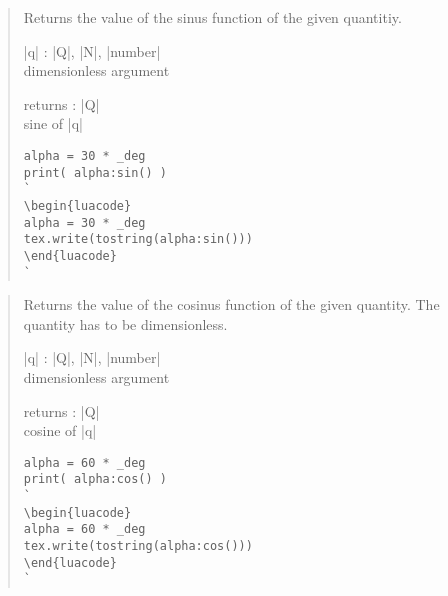 \documentclass{ltxdoc}
\begin{document}
\begin{quote}
  Returns the value of the sinus function of the given quantitiy.

  \begin{description}
  \item |q| : |Q|, |N|, |number|\\
    dimensionless argument

  \item returns : |Q|\\
    sine of |q|
  \end{description}

\begin{lstlisting}
alpha = 30 * _deg
print( alpha:sin() )
`
\begin{luacode}
alpha = 30 * _deg
tex.write(tostring(alpha:sin()))
\end{luacode}
`
\end{lstlisting}

\end{quote}



\begin{quote}
  Returns the value of the cosinus function of the given quantity. The quantity has to be dimensionless.

  \begin{description}
  \item |q| : |Q|, |N|, |number|\\
    dimensionless argument

  \item returns : |Q|\\
    cosine of |q|
  \end{description}

\begin{lstlisting}
alpha = 60 * _deg
print( alpha:cos() )
`
\begin{luacode}
alpha = 60 * _deg
tex.write(tostring(alpha:cos()))
\end{luacode}
`
\end{lstlisting}

\end{quote}
\end{document}
